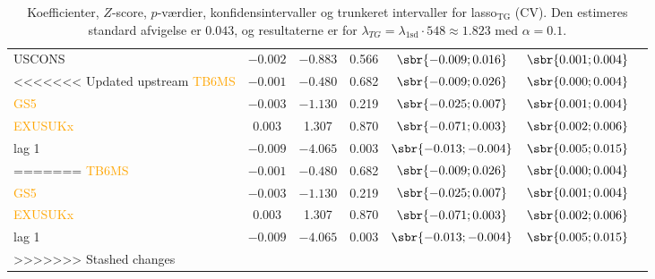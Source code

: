 \begin{table}[ht]
{\begin{tabular}{lcccccc}
\textcolor{blue3}{USCONS} & $-0.002$  & $-0.883$   & 0.566    &$\sbr{ -0.009    ; 0.016  } $ & $\sbr{0.001;0.004} $\\
<<<<<<< Updated upstream
\textcolor{orange}{TB6MS} &$- 0.001 $ & $-0.480$     &0.682  &  $\sbr{ -0.009    ; 0.026  } $ &$\sbr{ 0.000;0.004} $\\
\textcolor{orange}{GS5}  & $- 0.003 $  &$-1.130$ &0.219     &$\sbr{-0.025    ;0.007   } $    & $\sbr{0.001; 0.004} $\\
\textcolor{orange}{EXUSUKx}  & 0.003  &  1.307   &0.870    &$\sbr{ -0.071  ;  0.003     } $ &  $\sbr{0.002;0.006} $\\
\textcolor{blue3}{lag 1}  &$-0.009 $ &  $-4.065$  &   0.003   &  $\sbr{-0.013 ;  -0.004      } $   &$\sbr{0.005;0.015} $\\
=======
\textcolor{orange}{TB6MS} & $- 0.001$  & $-0.480$     &0.682  &  $\sbr{ -0.009    ; 0.026  } $ &$\sbr{ 0.000;0.004} $\\
\textcolor{orange}{GS5}  & $-0.003$   &$-1.130$ &0.219     &$\sbr{-0.025    ;0.007   } $    & $\sbr{0.001; 0.004} $\\
\textcolor{orange}{EXUSUKx}  & 0.003  &  1.307   &0.870    &$\sbr{ -0.071  ;  0.003     } $ &  $\sbr{0.002;0.006} $\\
\textcolor{blue3}{lag 1}  & $-0.009$  &  $-4.065$  &   0.003   &  $\sbr{-0.013 ;  -0.004      } $   &$\sbr{0.005;0.015} $\\
>>>>>>> Stashed changes
\bottomrule
\end{tabular}  
}
\caption{Koefficienter, \(Z\)-score, \(p\)-værdier, konfidensintervaller og trunkeret intervaller for lasso$_{\text{TG}}$ (CV). Den estimeres standard afvigelse er \(0.043\), og resultaterne er for \(\lambda_{TG} = \lambda_\text{1sd} \cdot 548 \approx 1.823\) med \(\alpha = 0.1\).} \label{tab:fixedLassoInf}
\end{table} 